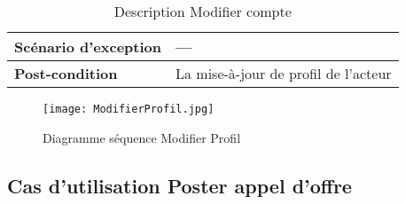 \begin{center}
\begin{table}[H]
{\begin{tabular}{ | l | m{0.51\textheight} |}
			\hline
			\cellcolor[HTML]{99ccff} \textbf{Scénario d'exception} & ---\\
			\hline
			\cellcolor[HTML]{99ccff} \textbf{Post-condition} & La mise-à-jour de profil de l'acteur\\
			\hline
		\end{tabular}}
		\caption{Description Modifier compte}
		\label{table:modifier account}
	\end{table}
	\begin{figure}[H]
		\centering
		\texttt{[image: ModifierProfil.jpg]}
		\caption{Diagramme séquence Modifier Profil}
		\label{fig:seq update account}
	\end{figure}
\end{center}


\subsection{Cas d'utilisation Poster appel d'offre}
\renewcommand{\arraystretch}{2}
